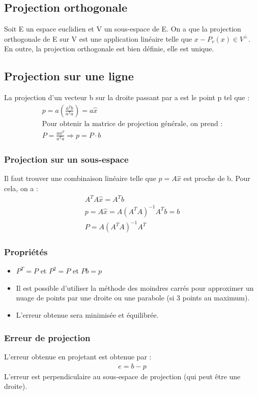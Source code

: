 \documentclass[a4paper]{book}
\begin{document}
\subsection{Projection orthogonale}
Soit E un espace euclidien et V un sous-espace de E. On a que la projection orthogonale de E sur V est une application linéaire telle que $x - P_v(x) \in V^\perp $. En outre, la projection orthogonale est bien définie, elle est unique.
\subsection{Projection sur une ligne}
La projection d'un vecteur b sur la droite passant par a est le point p tel que :
\begin{gather}
    p = a(\frac{a^Tb}{a^Ta}) = a\hat{x} \\
    \text{Pour obtenir la matrice de projection générale, on prend :} \\
    P = \frac{aa^T}{a^Ta} \Rightarrow p = P\cdot b
\end{gather}
\subsubsection{Projection sur un sous-espace}
Il faut trouver une combinaison linéaire telle que $p = A\hat{x}$ est proche de b.
Pour cela, on a :
\begin{gather}
    A^TA\hat{x} = A^Tb \\
    p = A\hat{x} = A(A^TA)^{-1}A^Tb = b \\
    P = A(A^TA)^{-1}A^T
\end{gather}
\subsubsection{Propriétés}
\begin{itemize}
    \item $P^T = P$ et $P^2 = P$ et $Pb = p$ \\
    \item Il est possible d'utiliser la méthode des moindres carrés pour approximer un nuage de points par une droite ou une parabole (si 3 points au maximum).
    \item L'erreur obtenue sera minimisée et équilibrée.
\end{itemize}
\subsubsection{Erreur de projection}
L'erreur obtenue en projetant est obtenue par :
\begin{gather}
    e = b-p
\end{gather}
L'erreur est perpendiculaire au sous-espace de projection (qui peut être une droite).
\end{document}
